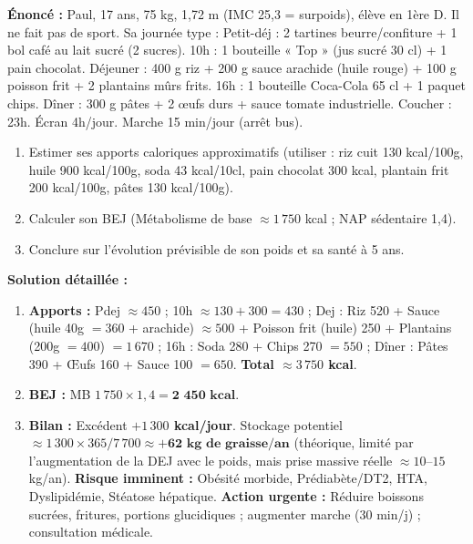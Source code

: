 \documentclass[11pt]{article}
\begin{document}
\begin{exoresolu}
\textbf{Énoncé :} Paul, 17 ans, 75 kg, 1,72 m (IMC 25,3 = surpoids), élève en 1ère D. Il ne fait pas de sport. Sa journée type : Petit-déj : 2 tartines beurre/confiture + 1 bol café au lait sucré (2 sucres). 10h : 1 bouteille « Top » (jus sucré 30 cl) + 1 pain chocolat. Déjeuner : 400 g riz + 200 g sauce arachide (huile rouge) + 100 g poisson frit + 2 plantains mûrs frits. 16h : 1 bouteille Coca-Cola 65 cl + 1 paquet chips. Dîner : 300 g pâtes + 2 œufs durs + sauce tomate industrielle. Coucher : 23h. Écran 4h/jour. Marche 15 min/jour (arrêt bus).
\begin{enumerate}
    \item Estimer ses apports caloriques approximatifs (utiliser : riz cuit 130 kcal/100g, huile 900 kcal/100g, soda 43 kcal/10cl, pain chocolat 300 kcal, plantain frit 200 kcal/100g, pâtes 130 kcal/100g).
    \item Calculer son BEJ (Métabolisme de base $\approx 1\,750$ kcal ; NAP sédentaire 1,4).
    \item Conclure sur l'évolution prévisible de son poids et sa santé à 5 ans.
\end{enumerate}
\textbf{Solution détaillée :}
\begin{enumerate}
    \item \textbf{Apports :} Pdej $\approx 450$ ; 10h $\approx 130 + 300 = 430$ ; Dej : Riz 520 + Sauce (huile 40g $= 360$ + arachide) $\approx 500$ + Poisson frit (huile) 250 + Plantains (200g $= 400$) $= 1\,670$ ; 16h : Soda 280 + Chips 270 $= 550$ ; Dîner : Pâtes 390 + Œufs 160 + Sauce 100 $= 650$. \textbf{Total $\approx 3\,750$ kcal}.
    \item \textbf{BEJ :} MB $1\,750 \times 1,4 = \textbf{2 450 kcal}$.
    \item \textbf{Bilan :} Excédent \textbf{$+1\,300$ kcal/jour}. Stockage potentiel $\approx 1\,300 \times 365 / 7\,700 \approx \textbf{+62 kg de graisse/an}$ (théorique, limité par l'augmentation de la DEJ avec le poids, mais prise massive réelle $\approx 10$--$15$ kg/an). \textbf{Risque imminent :} Obésité morbide, Prédiabète/DT2, HTA, Dyslipidémie, Stéatose hépatique. \textbf{Action urgente :} Réduire boissons sucrées, fritures, portions glucidiques ; augmenter marche (30 min/j) ; consultation médicale.
\end{enumerate}
\end{exoresolu}
\end{document}

